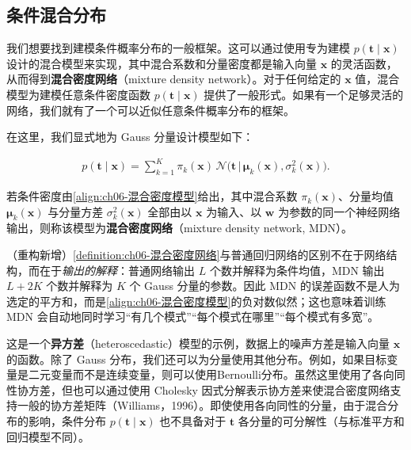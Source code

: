 \documentclass[../../main.tex]{subfiles}
\begin{document}
\subsection{条件混合分布}\label{subsection:ch06-条件混合分布}

我们想要找到建模条件概率分布的一般框架。这可以通过使用专为建模 $p(\boldsymbol{t}\mid\boldsymbol{x})$ 设计的混合模型来实现，其中混合系数和分量密度都是输入向量 $\boldsymbol{x}$ 的灵活函数，从而得到\textbf{混合密度网络}（mixture density network）。对于任何给定的 $\boldsymbol{x}$ 值，混合模型为建模任意条件密度函数 $p(\boldsymbol{t}\mid\boldsymbol{x})$ 提供了一般形式。如果有一个足够灵活的网络，我们就有了一个可以近似任意条件概率分布的框架。

在这里，我们显式地为 Gauss 分量设计模型如下：

\begin{align}
p(\boldsymbol{t}\mid\boldsymbol{x})=\sum_{k=1}^{K}\pi_k(\boldsymbol{x})\,\mathcal{N}\bigl(\boldsymbol{t}\,\big|\,\boldsymbol{\mu}_k(\boldsymbol{x}),\sigma_k^{2}(\boldsymbol{x})\bigr).
\label{align:ch06-混合密度模型}
\end{align}

\begin{definition}[混合密度网络]\label{definition:ch06-混合密度网络}
若条件密度由\eqref{align:ch06-混合密度模型}给出，其中混合系数 $\pi_k(\boldsymbol{x})$、分量均值 $\boldsymbol{\mu}_k(\boldsymbol{x})$ 与分量方差 $\sigma_k^{2}(\boldsymbol{x})$ 全部由以 $\boldsymbol{x}$ 为输入、以 $\boldsymbol{w}$ 为参数的同一个神经网络输出，则称该模型为\textbf{混合密度网络}（mixture density network, MDN）。
\end{definition}

\begin{remark}（重构新增）\cref{definition:ch06-混合密度网络}与普通回归网络的区别不在于网络结构，而在于\emph{输出的解释}：普通网络输出 $L$ 个数并解释为条件均值，MDN 输出 $L+2K$ 个数并解释为 $K$ 个 Gauss 分量的参数。因此 MDN 的误差函数不是人为选定的平方和，而是\eqref{align:ch06-混合密度模型}的负对数似然；这也意味着训练 MDN 会自动地同时学习“有几个模式”“每个模式在哪里”“每个模式有多宽”。
\end{remark}

这是一个\textbf{异方差}（heteroscedastic）模型的示例，数据上的噪声方差是输入向量 $\boldsymbol{x}$ 的函数。除了 Gauss 分布，我们还可以为分量使用其他分布。例如，如果目标变量是二元变量而不是连续变量，则可以使用Bernoulli分布。虽然这里使用了各向同性协方差，但也可以通过使用 Cholesky 因式分解表示协方差来使混合密度网络支持一般的协方差矩阵（Williams，1996）。即使使用各向同性的分量，由于混合分布的影响，条件分布 $p(\boldsymbol{t}\mid\boldsymbol{x})$ 也不具备对于 $\boldsymbol{t}$ 各分量的可分解性（与标准平方和回归模型不同）。
\end{document}
